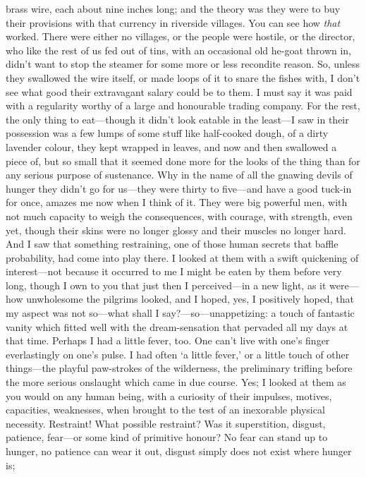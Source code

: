 \documentclass[12pt]{report}
\begin{document}
brass wire, each about nine inches long; and the theory was they were to
buy their provisions with that currency in riverside villages. You can
see how \emph{that} worked. There were either no villages, or the people
were hostile, or the director, who like the rest of us fed out of tins,
with an occasional old he-goat thrown in, didn't want to stop the
steamer for some more or less recondite reason. So, unless they
swallowed the wire itself, or made loops of it to snare the fishes with,
I don't see what good their extravagant salary could be to them. I must
say it was paid with a regularity worthy of a large and honourable
trading company. For the rest, the only thing to eat---though it didn't
look eatable in the least---I saw in their possession was a few lumps of
some stuff like half-cooked dough, of a dirty lavender colour, they kept
wrapped in leaves, and now and then swallowed a piece of, but so small
that it seemed done more for the looks of the thing than for any serious
purpose of sustenance. Why in the name of all the gnawing devils of
hunger they didn't go for us---they were thirty to five---and have a
good tuck-in for once, amazes me now when I think of it. They were big
powerful men, with not much capacity to weigh the consequences, with
courage, with strength, even yet, though their skins were no longer
glossy and their muscles no longer hard. And I saw that something
restraining, one of those human secrets that baffle probability, had
come into play there. I looked at them with a swift quickening of
interest---not because it occurred to me I might be eaten by them before
very long, though I own to you that just then I perceived---in a new
light, as it were---how unwholesome the pilgrims looked, and I hoped,
yes, I positively hoped, that my aspect was not so---what shall I
say?---so---unappetizing: a touch of fantastic vanity which fitted well
with the dream-sensation that pervaded all my days at that time. Perhaps
I had a little fever, too. One can't live with one's finger
everlastingly on one's pulse. I had often `a little fever,' or a little
touch of other things---the playful paw-strokes of the wilderness, the
preliminary trifling before the more serious onslaught which came in due
course. Yes; I looked at them as you would on any human being, with a
curiosity of their impulses, motives, capacities, weaknesses, when
brought to the test of an inexorable physical necessity. Restraint! What
possible restraint? Was it superstition, disgust, patience, fear---or
some kind of primitive honour? No fear can stand up to hunger, no
patience can wear it out, disgust simply does not exist where hunger is;
\end{document}
